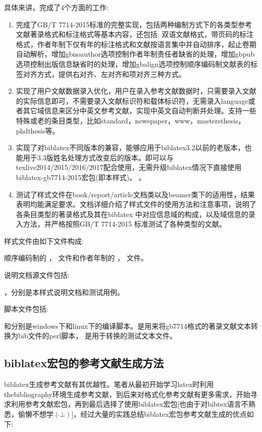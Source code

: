 具体来讲，完成了4个方面的工作:
\begin{enumerate}
  \item 完成了GB/T 7714-2015标准的完整实现，包括两种编制方式下的各类型参考文献著录格式和标注格式等基本内容，还包括: 双语文献格式，带页码的标注格式，作者年制下仅有年的标注格式和文献按语言集中并自动排序，起止卷期自动解析，增加gbnoauthor选项控制作者年制责任者缺省的处理，增加gbpub选项控制出版信息缺省时的处理，增加gbalign选项控制顺序编码制文献表的标签对齐方式，提供右对齐、左对齐和项对齐三种方式。
  \item 实现了用户文献数据录入优化，用户在录入参考文献数据时，只需要录入文献的实际信息即可，不需要录入文献标识符和载体标识符，无需录入language或者其它域信息来区分中英文参考文献，实现中英文自动判断并处理。支持一些特殊或老的条目类型，比如standard，newspaper，www，mastersthesis，phdthesis等。
  \item 实现了对biblatex不同版本的兼容，能够应用于biblatex3.2以前的老版本，也能用于3.3版姓名处理方式改变后的版本。即可以与texlive2014/2015/2016/2017配合使用，无需升级biblatex情况下直接使用biblatex-gb7714-2015宏包(即本样式)。
      。
  \item 测试了样式文件在book/report/article文档类以及beamer类下的适用性，结果表明均能满足要求。文档详细介绍了样式文件的使用方法和注意事项，说明了各条目类型的著录格式及其在biblatex 中对应信息域的构成，以及域信息的录入方法，并严格按照GB/T 7714-2015 标准测试了各种类型的文献。
\end{enumerate}

样式文件由如下文件构成:

顺序编码制的 ， 文件和作者年制的
， 文件。

说明文档源文件包括:

，分别是本样式说明文档和测试用例。

脚本文件包括:

和分别是windows下和linux下的编译脚本。是用来将gb7714格式的著录文献文本转换为bib文件的perl脚本，
是用于转换的测试文本文件。

\subsection{biblatex宏包的参考文献生成方法}
biblatex生成参考文献有其优越性。笔者从最初开始学习latex时利用thebibliography环境生成参考文献，到后来对格式化参考文献有更多需求，开始寻求利用参考文献宏包，再到最后选择了使用biblatex宏包[也由于对bibtex语言不熟悉，偷懒不想学$( \hat{} \bot \hat{} )$]，经过大量的实践总结biblatex宏包参考文献生成的优点如下:

